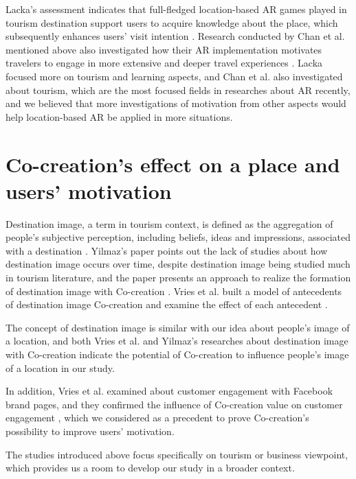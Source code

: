 Lacka's assessment indicates that full-fledged location-based AR games played in tourism destination support users to acquire knowledge about the place,
which subsequently enhances users' visit intention \cite{lacka_2018}.
Research conducted by Chan et al. mentioned above also investigated how their AR implementation motivates travelers to engage in more extensive and deeper travel experiences \cite{chan_lin_wang_lu_hsu_2017}.
Lacka focused more on tourism and learning aspects, and Chan et al. also investigated about tourism, which are the most focused fields in researches about AR recently,
and we believed that more investigations of motivation from other aspects would help location-based AR be applied in more situations.

\section{Co-creation's effect on a place and users' motivation}
Destination image, a term in tourism context, is defined as the aggregation of people's subjective perception,
including beliefs, ideas and impressions, associated with a destination \cite{kotler_haider_rein_2008}\cite{Lopes2011DestinationIO}.
Yilmaz's paper points out the lack of studies about how destination image occurs over time, despite destination image being studied much in tourism literature,
and the paper presents an approach to realize the formation of destination image with Co-creation \cite{yilmaz_2021}.
Vries et al. built a model of antecedents of destination image Co-creation and examine the effect of each antecedent \cite{glyptou_2021}.

The concept of destination image is similar with our idea about people's image of a location,
and both Vries et al. and Yilmaz's researches about destination image with Co-creation indicate the potential of Co-creation to influence people's image of a location in our study.

In addition, Vries et al. examined about customer engagement with Facebook brand pages, and they confirmed the influence of Co-creation value on customer engagement \cite{vries_carlson_2014},
which we considered as a precedent to prove Co-creation's possibility to improve users' motivation.

The studies introduced above focus specifically on tourism or business viewpoint, which provides us a room to develop our study in a broader context.

